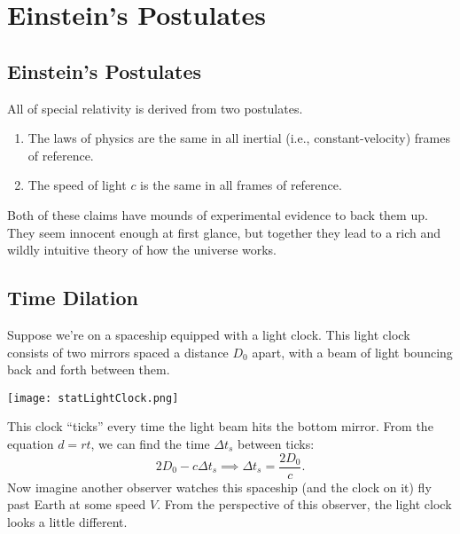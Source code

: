 \documentclass[../p023main.tex]{subfiles}
\begin{document}
\chapter{Einstein's Postulates}
\section{Einstein's Postulates}
All of special relativity is derived from two postulates.
\begin{enumerate}
    \item The laws of physics are the same in all inertial (i.e., constant-velocity) frames of reference.
    \item The speed of light $c$ is the same in all frames of reference.
\end{enumerate}
Both of these claims have mounds of experimental evidence to back them up.
They seem innocent enough at first glance, but together they lead to a rich and wildly intuitive theory of how the universe works.

\section{Time Dilation}
Suppose we're on a spaceship equipped with a light clock.
This light clock consists of two mirrors spaced a distance $D_0$ apart, with a beam of light bouncing back and forth between them.
\begin{center}
    \texttt{[image: statLightClock.png]}
\end{center}
This clock ``ticks'' every time the light beam hits the bottom mirror.
From the equation $d = rt$, we can find the time $\Delta t_s$ between ticks:
\[ 2D_0 - c \Delta t_s \implies \Delta t_s = \frac{2D_0}{c}. \]
Now imagine another observer watches this spaceship (and the clock on it) fly past Earth at some speed $V$.
From the perspective of this observer, the light clock looks a little different.
\end{document}
